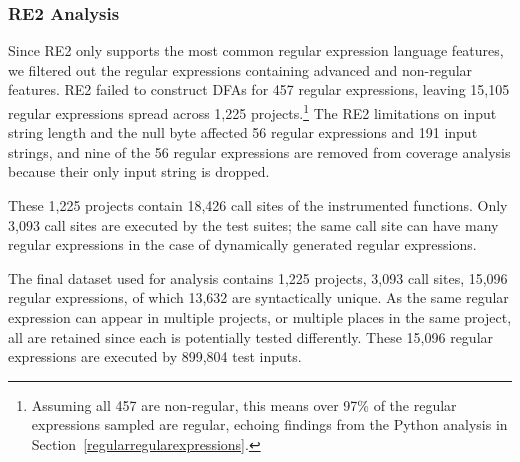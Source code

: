 \subsubsection{RE2 Analysis}
 Since RE2 only supports the most common regular expression language features, we filtered out the regular expressions containing advanced and non-regular features.
RE2 failed to construct DFAs for 457 regular expressions, leaving 15,105 regular expressions spread across 1,225 projects.\footnote{Assuming all 457 are non-regular, this means over 97\% of the regular expressions sampled are regular, echoing findings from the Python analysis in Section~\ref{regularregularexpressions}.} 
The RE2 limitations on input string length and the null byte affected 56 regular expressions and 191 input strings, and nine of the 56 regular expressions are removed from coverage analysis because their only input string is dropped. 

These 1,225 projects contain  18,426 call sites of the instrumented functions. Only 3,093 call sites are executed by the test suites; the same call site can have many regular expressions in the case of dynamically generated regular expressions. 


The final dataset used for analysis contains 1,225 projects, 3,093 call sites, 15,096 regular expressions, of which 13,632 are syntactically unique. As the same regular expression can appear in multiple projects, or multiple places in the same project, all are retained since each is potentially tested differently. These 15,096 regular expressions are executed by 899,804 test inputs. %


